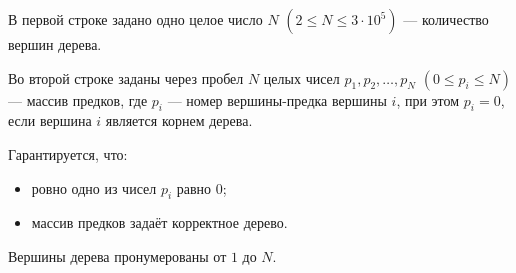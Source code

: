 В первой строке задано одно целое число $N$ $(2 \le N \le 3 \cdot 10^5)$ --- количество вершин дерева.

Во второй строке заданы через пробел $N$ целых чисел $p_1, p_2, \ldots, p_N$ $(0 \le p_i \le N)$ --- массив предков, где $p_i$ --- номер вершины-предка вершины $i$, при этом $p_i = 0$, если вершина $i$ является корнем дерева.

Гарантируется, что:

\begin{itemize}

\item ровно одно из чисел $p_i$ равно $0$;

\item массив предков задаёт корректное дерево.

\end{itemize}

Вершины дерева пронумерованы от $1$ до $N$.
